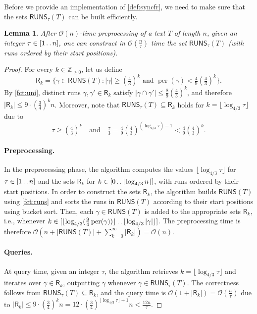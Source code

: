 \documentclass[a4paper]{article}
\newtheorem{lemma}[theorem]{Lemma}
\theoremstyle{definition}
\theoremstyle{remark}
\newcommand{\Zz}{\mathbb{Z}_{\ge 0}}
\newcommand{\sub}{\subseteq}
\newcommand{\dd}{\mathinner{\ldotp\ldotp}}
\DeclareMathOperator{\per}{per}
\newcommand{\RUNS}{\mathsf{RUNS}}
\newcommand{\Runs}{\mathsf{R}}
\newcommand{\Oh}{\mathcal{O}}
\begin{document}
Before we provide an implementation of \cref{def:syncfr}, we need to make sure that the sets $\RUNS_\tau(T)$ can be built efficiently.
\begin{lemma}\label{lem:tauruns}
  After $\Oh(n)$-time preprocessing of a text $T$ of length $n$,
  given an integer $\tau\in [1\dd n]$, 
  one can construct in $\Oh(\frac{n}{\tau})$ time the set $\RUNS_{\tau}(T)$ (with runs ordered by their start positions). 
\end{lemma}
\begin{proof}
  For every $k\in \Zz$, let us define 
  \[\Runs_k = \{\gamma \in \RUNS(T) : |\gamma|\ge (\tfrac43)^k\text{ and }\per(\gamma)< \tfrac49 (\tfrac43)^k\}.\]
  By \cref{fct:uni}, distinct runs $\gamma,\gamma'\in \Runs_k$ satisfy $|\gamma \cap \gamma'| \le \frac89(\tfrac43)^k$,
  and therefore $|\Runs_k| \le 9\cdot (\tfrac34)^k n$.
  Moreover, note that $\RUNS_\tau(T)\sub \Runs_k$ holds for $k = \lfloor{\log_{4/3} \tau}\rfloor$ due to
  \[\tau \ge (\tfrac43)^k\quad \text{and} \quad \tfrac{\tau}{3}=\tfrac49 (\tfrac43)^{(\log_{4/3}\tau)-1} < \tfrac49(\tfrac43)^k.\]
 
  \paragraph{\bf Preprocessing.}  In the preprocessing phase, the algorithm computes the values $\lfloor{\log_{4/3} \tau}\rfloor$ for $\tau \in [1\dd n]$
  and the sets $\Runs_k$ for $k\in [0\dd \lfloor{\log_{4/3} n}\rfloor]$,
  with runs ordered by their start positions.
  In order to construct the sets $\Runs_k$, the algorithm builds $\RUNS(T)$ using \cref{fct:runs}
  and sorts the runs in $\RUNS(T)$ according to their start positions using bucket sort.
  Then, each $\gamma \in \RUNS(T)$ is added to the appropriate sets $\Runs_k$,
  i.e., whenever $k\in [\lfloor{\log_{4/3} (\frac94 \per(\gamma))}\rfloor\dd \lfloor{\log_{4/3} |\gamma|}\rfloor]$.
  The preprocessing time is therefore $\Oh(n + |\RUNS(T)| + \sum_{k=0}^\infty |\Runs_k|)
  = \Oh(n)$.
\paragraph{\bf Queries.}  At query time, given an integer $\tau$, the algorithm retrieves $k= \lfloor{\log_{4/3} \tau}\rfloor$
  and iterates over $\gamma \in \Runs_k$, outputting $\gamma$ whenever $\gamma \in \RUNS_{\tau}(T)$.
  The correctness follows from  $\RUNS_\tau(T)\sub \Runs_k$, and the query time is $\Oh(1+|\Runs_k|)
  = \Oh(\frac{n}{\tau})$ due to $|\Runs_k| \le 9\cdot (\tfrac34)^k n = 12\cdot (\tfrac34)^{\lfloor \log_{4/3} \tau\rfloor + 1}n < \frac{12n}{\tau}$.
\end{proof}
\end{document}
